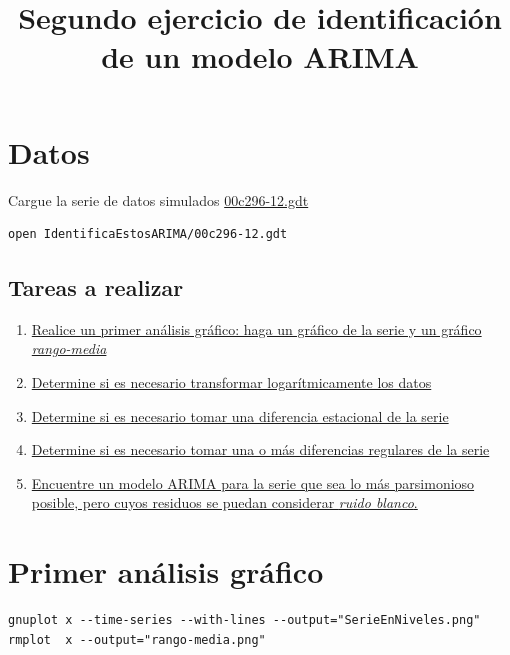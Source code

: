 \documentclass[10pt]{article}
\date{}
\title{Segundo ejercicio de identificación de un modelo ARIMA}
\begin{document}
\maketitle
\section*{Datos}
\label{sec:org4e7af39}

Cargue la serie de datos simulados \href{IdentificaEstosARIMA/00c296-12.gdt}{00c296-12.gdt}

\begin{verbatim}
open IdentificaEstosARIMA/00c296-12.gdt
\end{verbatim}
\subsection*{Tareas a realizar}
\label{sec:org3fae9e9}

\begin{enumerate}
\item \hyperref[sec:org6c88b85]{Realice un primer análisis gráfico: haga
un gráfico de la serie y un gráfico \emph{rango-media}}
\item \hyperref[sec:org6142ddf]{Determine si es necesario transformar logarítmicamente los datos}
\item \hyperref[sec:orgd530ff7]{Determine si es necesario tomar una
diferencia estacional de la serie}
\item \hyperref[sec:orgc98824b]{Determine si es necesario tomar una o
más diferencias regulares de la serie}
\item \hyperref[sec:org459f8d2]{Encuentre un modelo ARIMA para la
serie que sea lo más parsimonioso posible, pero cuyos residuos se
puedan considerar \emph{ruido blanco}.}
\end{enumerate}
\section*{Primer análisis gráfico}
\label{sec:org6c88b85}


\begin{verbatim}
gnuplot x --time-series --with-lines --output="SerieEnNiveles.png"
rmplot  x --output="rango-media.png"
\end{verbatim}
\end{document}
